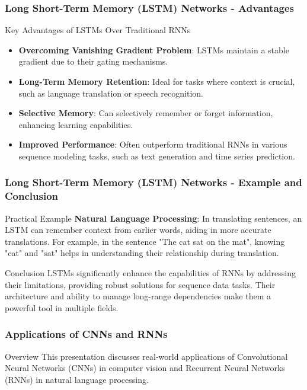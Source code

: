 \documentclass{beamer}
\begin{document}
\begin{frame}[fragile]
    \frametitle{Long Short-Term Memory (LSTM) Networks - Advantages}
    \begin{block}{Key Advantages of LSTMs Over Traditional RNNs}
        \begin{itemize}
            \item \textbf{Overcoming Vanishing Gradient Problem}: LSTMs maintain a stable gradient due to their gating mechanisms.
            \item \textbf{Long-Term Memory Retention}: Ideal for tasks where context is crucial, such as language translation or speech recognition.
            \item \textbf{Selective Memory}: Can selectively remember or forget information, enhancing learning capabilities.
            \item \textbf{Improved Performance}: Often outperform traditional RNNs in various sequence modeling tasks, such as text generation and time series prediction.
        \end{itemize}
    \end{block}
\end{frame}

\begin{frame}[fragile]
    \frametitle{Long Short-Term Memory (LSTM) Networks - Example and Conclusion}
    \begin{block}{Practical Example}
        \textbf{Natural Language Processing}: In translating sentences, an LSTM can remember context from earlier words, aiding in more accurate translations. 
        For example, in the sentence "The cat sat on the mat", knowing "cat" and "sat" helps in understanding their relationship during translation.
    \end{block}

    \begin{block}{Conclusion}
        LSTMs significantly enhance the capabilities of RNNs by addressing their limitations, providing robust solutions for sequence data tasks. Their architecture and ability to manage long-range dependencies make them a powerful tool in multiple fields.
    \end{block}
\end{frame}

\begin{frame}[fragile]
    \frametitle{Applications of CNNs and RNNs}
    \begin{block}{Overview}
        This presentation discusses real-world applications of Convolutional Neural Networks (CNNs) in computer vision and Recurrent Neural Networks (RNNs) in natural language processing.
    \end{block}
\end{frame}
\end{document}
